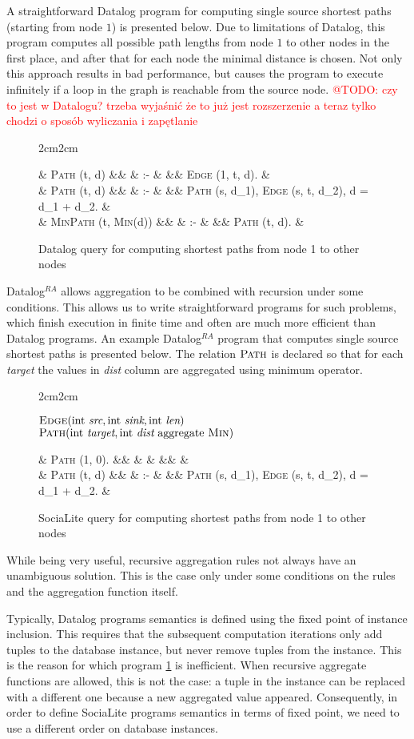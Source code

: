 \documentclass{pracamgr}
\makeatletter
\theoremstyle{plain}
\theoremstyle{definition}
\theoremstyle{remark}
\newcommand{\todo}[1]{\textcolor{red}{@TODO: #1}}
\newcommand{\datalogra}{Datalog$^{RA}$ }
\newcommand{\narrow}[1]{\begin{changemargin}{2cm}{2cm} #1 \end{changemargin}}
\newcommand{\dprog}[4]{
  \begin{figure}[h!]
    \narrow{
      #1
      \begin{flalign*}
      #2
      \end{flalign*}
      \caption{#3}
      \label{#4}
  }
\end{figure}

}
\makeatother
\begin{document}
A straightforward Datalog program for computing single source shortest paths (starting from node $1$) is presented below. Due to limitations of Datalog, this program computes all possible path lengths from node $1$ to other nodes in the first place, and after that for each node the minimal distance is chosen. Not only this approach results in bad performance, but causes the program to execute infinitely if a loop in the graph is reachable from the source node. \todo{czy to jest w Datalogu?
trzeba wyjaśnić że to już jest rozszerzenie a teraz tylko chodzi o sposób wyliczania i zapętlanie}

\dprog{}{
  & \textsc{Path} (t, d) &&  & :- & && \textsc{Edge} (1, t, d). & \\
  & \textsc{Path} (t, d) &&  & :- & && \textsc{Path} (s, d_1), \textsc{Edge} (s, t, d_2), d = d_1 + d_2. & \\
  & \textsc{MinPath} (t, \textsc{Min}(d)) &&  & :- & && \textsc{Path} (t, d). &
}{Datalog query for computing shortest paths from node 1 to other nodes}{ex:ssspdatalog}

\datalogra allows aggregation to be combined with recursion under some conditions. This allows us to write straightforward programs for such problems, which finish execution in finite time and often are much more efficient than Datalog programs. An example \datalogra program that computes single source shortest paths is presented below. The relation $\textsc{Path}$ is declared so that for each \textit{target} the values in \textit{dist} column are aggregated using minimum operator.


\dprog{
  $\textsc{Edge}(\text{int } \textit{src}, \text{int } \textit{sink}, \text{int } \textit{len}) $ \\
  $\textsc{Path}(\text{int } \textit{target}, \text{int } \textit{dist} \text{ aggregate } \textsc{Min}) $
}{
  & \textsc{Path} (1, 0). &&  & & &&  & \\
  & \textsc{Path} (t, d) &&  & :- & && \textsc{Path} (s, d_1), \textsc{Edge} (s, t, d_2), d = d_1 + d_2. &
}{SociaLite query for computing shortest paths from node 1 to other nodes}{ex:ssspsocialite}

While being very useful, recursive aggregation rules not always have an unambiguous solution. This is the case only under some conditions on the rules and the aggregation function itself.

Typically, Datalog programs semantics is defined using the fixed point of instance inclusion. This requires that the subsequent computation iterations only add tuples to the database instance, but never remove tuples from the instance. This is the reason for which program \ref{ex:ssspdatalog} is inefficient. When recursive aggregate functions are allowed, this is not the case: a tuple in the instance can be replaced with a different one because a new aggregated value appeared. Consequently, in order to define SociaLite programs semantics in terms of fixed point, we need to use a different order on database instances.
\end{document}
